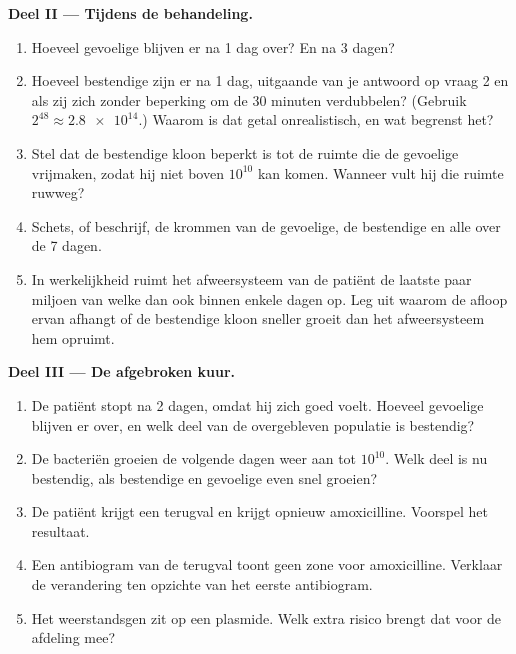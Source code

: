 \begin{problem}
\medskip
\noindent\textbf{Deel II --- Tijdens de behandeling.}
\begin{enumerate}[resume]
  \item Hoeveel gevoelige  blijven er na 1 dag over? En na 3 dagen?
  \item Hoeveel bestendige  zijn er na 1 dag, uitgaande van je
        antwoord op vraag 2 en als zij zich zonder beperking om de 30
        minuten verdubbelen? (Gebruik $2^{48} \approx \num{2.8e14}$.)
        Waarom is dat getal onrealistisch, en wat begrenst het?
  \item Stel dat de bestendige kloon beperkt is tot de ruimte die de
        gevoelige  vrijmaken, zodat hij niet boven $10^{10}$ kan
        komen. Wanneer vult hij die ruimte ruwweg?
  \item Schets, of beschrijf, de krommen van de gevoelige, de bestendige
        en alle  over de 7 dagen.
  \item In werkelijkheid ruimt het afweersysteem van de patiënt de
        laatste paar miljoen  van welke  dan ook binnen enkele
        dagen op. Leg uit waarom de afloop ervan afhangt of de bestendige
        kloon sneller groeit dan het afweersysteem hem opruimt.
\end{enumerate}

\medskip
\noindent\textbf{Deel III --- De afgebroken kuur.}
\begin{enumerate}[resume]
  \item De patiënt stopt na 2 dagen, omdat hij zich goed voelt. Hoeveel
        gevoelige  blijven er over, en welk deel van de
        overgebleven populatie is bestendig?
  \item De bacteriën groeien de volgende dagen weer aan tot $10^{10}$.
        Welk deel is nu bestendig, als bestendige en gevoelige 
        even snel groeien?
  \item De patiënt krijgt een terugval en krijgt opnieuw amoxicilline.
        Voorspel het resultaat.
  \item Een antibiogram van de terugval toont geen zone voor
        amoxicilline. Verklaar de verandering ten opzichte van het eerste
        antibiogram.
  \item Het weerstandsgen zit op een plasmide. Welk extra risico brengt
        dat voor de afdeling mee?
\end{enumerate}


\end{problem}

